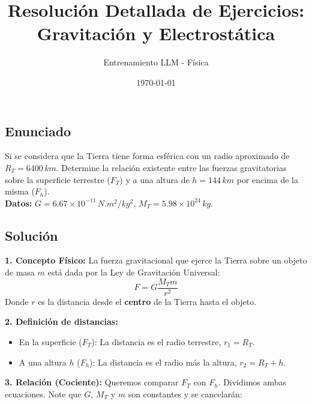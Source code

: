 \documentclass[12pt, a4paper]{article}
\title{Resolución Detallada de Ejercicios: Gravitación y Electrostática}
\author{Entrenamiento LLM - Física}
\date{\today}
\begin{document}
\maketitle
\tableofcontents
\newpage

\subsection*{Enunciado}
Si se considera que la Tierra tiene forma esférica con un radio aproximado de $R_T = 6400 \, \si{km}$. Determine la relación existente entre las fuerzas gravitatorias sobre la superficie terrestre ($F_T$) y a una altura de $h = 144 \, \si{km}$ por encima de la misma ($F_h$).
\\
\textbf{Datos:} $G=6.67\times10^{-11} \, \si{N.m^2/kg^2}$, $M_T=5.98 \times 10^{24} \, \si{kg}$.

\begin{center}
\end{center}

\subsection*{Solución}

\textbf{1. Concepto Físico:}
La fuerza gravitacional que ejerce la Tierra sobre un objeto de masa $m$ está dada por la Ley de Gravitación Universal:
$$ F = G \frac{M_T m}{r^2} $$
Donde $r$ es la distancia desde el \textbf{centro} de la Tierra hasta el objeto.

\textbf{2. Definición de distancias:}
\begin{itemize}
    \item En la superficie ($F_T$): La distancia es el radio terrestre, $r_1 = R_T$.
    \item A una altura $h$ ($F_h$): La distancia es el radio más la altura, $r_2 = R_T + h$.
\end{itemize}

\textbf{3. Relación (Cociente):}
Queremos comparar $F_T$ con $F_h$. Dividimos ambas ecuaciones. Note que $G$, $M_T$ y $m$ son constantes y se cancelarán:
\end{document}
